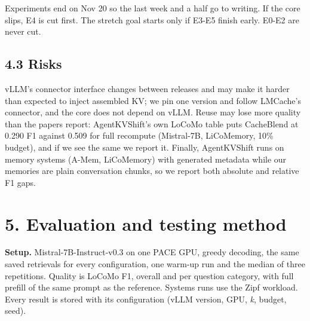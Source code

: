 \documentclass[
  10pt,
]{article}
\begin{document}
Experiments end on Nov 20 so the last week and a half go to writing. If
the core slips, E4 is cut first. The stretch goal starts only if E3-E5
finish early. E0-E2 are never cut.

\subsection{4.3 Risks}\label{risks}

vLLM's connector interface changes between releases and may make it
harder than expected to inject assembled KV; we pin one version and
follow LMCache's connector, and the core does not depend on vLLM. Reuse
may lose more quality than the papers report: AgentKVShift's own LoCoMo
table puts CacheBlend at 0.290 F1 against 0.509 for full recompute
(Mistral-7B, LiCoMemory, 10\% budget), and if we see the same we report
it. Finally, AgentKVShift runs on memory systems (A-Mem, LiCoMemory)
with generated metadata while our memories are plain conversation
chunks, so we report both absolute and relative F1 gaps.

\section{5. Evaluation and testing
method}\label{evaluation-and-testing-method}

\textbf{Setup.} Mistral-7B-Instruct-v0.3 on one PACE GPU, greedy
decoding, the same saved retrievals for every configuration, one warm-up
run and the median of three repetitions. Quality is LoCoMo F1, overall
and per question category, with full prefill of the same prompt as the
reference. Systems runs use the Zipf workload. Every result is stored
with its configuration (vLLM version, GPU, \emph{k}, budget, seed).
\end{document}
